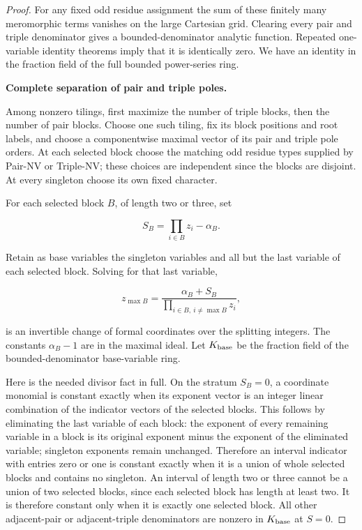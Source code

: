 \begin{proof}
For any fixed odd residue assignment the sum of these finitely many meromorphic terms vanishes on the large Cartesian grid. Clearing every pair and triple denominator gives a bounded-denominator analytic function. Repeated one-variable identity theorems imply that it is identically zero. We have an identity in the fraction field of the full bounded power-series ring.

\par\medskip\noindent\textbf{Complete separation of pair and triple poles.}

Among nonzero tilings, first maximize the number of triple blocks, then the number of pair blocks. Choose one such tiling, fix its block positions and root labels, and choose a componentwise maximal vector of its pair and triple pole orders. At each selected block choose the matching odd residue types supplied by Pair-NV or Triple-NV; these choices are independent since the blocks are disjoint. At every singleton choose its own fixed character.

For each selected block \(B\), of length two or three, set

\[
S_B=\prod_{i\in B}z_i-\alpha_B.
\]

Retain as base variables the singleton variables and all but the last variable of each selected block. Solving for that last variable,

\[
z_{\max B}=\frac{\alpha_B+S_B}
                   {\prod_{i\in B,\ i\ne\max B}z_i},
\]

is an invertible change of formal coordinates over the splitting integers. The constants \(\alpha_B-1\) are in the maximal ideal. Let \(K_{\rm base}\) be the fraction field of the bounded-denominator base-variable ring.

Here is the needed divisor fact in full. On the stratum \(S_B=0\), a coordinate monomial is constant exactly when its exponent vector is an integer linear combination of the indicator vectors of the selected blocks. This follows by eliminating the last variable of each block: the exponent of every remaining variable in a block is its original exponent minus the exponent of the eliminated variable; singleton exponents remain unchanged. Therefore an interval indicator with entries zero or one is constant exactly when it is a union of whole selected blocks and contains no singleton. An interval of length two or three cannot be a union of two selected blocks, since each selected block has length at least two. It is therefore constant only when it is exactly one selected block. All other adjacent-pair or adjacent-triple denominators are nonzero in \(K_{\rm base}\) at \(S=0\).


\end{proof}
